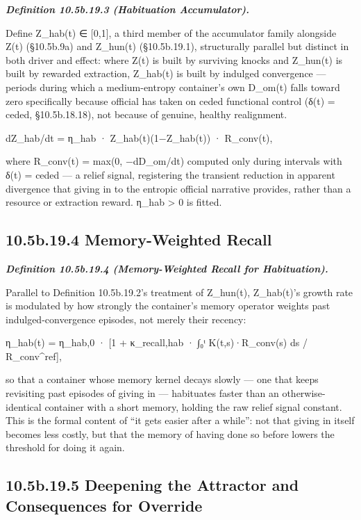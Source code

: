\documentclass[
]{article}
\begin{document}
\emph{\textbf{Definition 10.5b.19.3 (Habituation Accumulator).}}

Define Z\_hab(t) ∈ {[}0,1{]}, a third member of the accumulator family
alongside Z(t) (§10.5b.9a) and Z\_hun(t) (§10.5b.19.1), structurally
parallel but distinct in both driver and effect: where Z(t) is built by
surviving knocks and Z\_hun(t) is built by rewarded extraction,
Z\_hab(t) is built by indulged convergence --- periods during which a
medium-entropy container's own D\_om(t) falls toward zero specifically
because official has taken on ceded functional control (δ(t) = ceded,
§10.5b.18.18), not because of genuine, healthy realignment.

dZ\_hab/dt = η\_hab · Z\_hab(t)(1−Z\_hab(t)) · R\_conv(t),

where R\_conv(t) = max(0, −dD\_om/dt) computed only during intervals
with δ(t) = ceded --- a relief signal, registering the transient
reduction in apparent divergence that giving in to the entropic official
narrative provides, rather than a resource or extraction reward. η\_hab
\textgreater{} 0 is fitted.

\hypertarget{b.19.4-memory-weighted-recall}{%
\subsection{10.5b.19.4 Memory-Weighted
Recall}\label{b.19.4-memory-weighted-recall}}

\emph{\textbf{Definition 10.5b.19.4 (Memory-Weighted Recall for
Habituation).}}

Parallel to Definition 10.5b.19.2's treatment of Z\_hun(t), Z\_hab(t)'s
growth rate is modulated by how strongly the container's memory operator
weights past indulged-convergence episodes, not merely their recency:

η\_hab(t) = η\_hab,0 · {[}1 + κ\_recall,hab · ∫₀ᵗ K(t,s)·R\_conv(s) ds /
R\_conv\^{}ref{]},

so that a container whose memory kernel decays slowly --- one that keeps
revisiting past episodes of giving in --- habituates faster than an
otherwise-identical container with a short memory, holding the raw
relief signal constant. This is the formal content of ``it gets easier
after a while'': not that giving in itself becomes less costly, but that
the memory of having done so before lowers the threshold for doing it
again.

\hypertarget{b.19.5-deepening-the-attractor-and-consequences-for-override}{%
\subsection{10.5b.19.5 Deepening the Attractor and Consequences for
Override}\label{b.19.5-deepening-the-attractor-and-consequences-for-override}}
\end{document}
